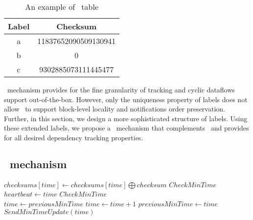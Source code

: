 \begin{table}
\caption{An example of \acker\ table}
    \begin{center}
        \begin{tabular}{ |c|c| } 
         \hline
         Label & Checksum \\ 
         \hline
         a & 11837652090509130941 \\ 
         b & 0 \\
         c & 9302885073111445477 \\
         \hline
        \end{tabular}
    \end{center}
\label{ack_table}
\end{table}

\acker\ mechanism provides for the fine granularity of tracking and cyclic dataflows support out-of-the-box. However, only the uniqueness property of labels does not allow \acker\ to support block-level locality and notifications order preservation. Further, in this section, we design a more sophisticated structure of labels. Using these extended labels, we propose a \tracker\ mechanism that complements \acker\ and provides for all desired dependency tracking properties. 

\subsection{\tracker\ mechanism}


\begin{algorithm}
\caption{\tracker}
\begin{algorithmic}[1]
\State $checksums[time] \gets checksums[time] \bigoplus checksum$
\State $CheckMinTime$
\EndProcedure
\\
\State $heartbeat \gets time$
\State $CheckMinTime$
\EndProcedure
\\
\State $time \gets previousMinTime$
\State $time \gets time + 1$
\EndWhile
{}
\State $previousMinTime \gets time$
\State $SendMinTimeUpdate(time)$
\EndIf
\EndProcedure
\end{algorithmic}
\end{algorithm}

 
